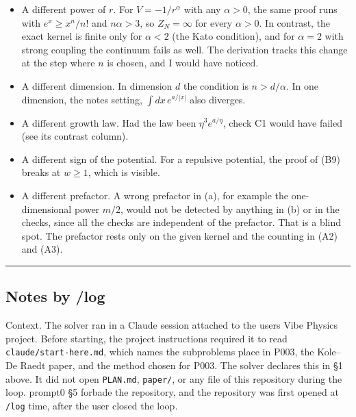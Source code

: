 \documentclass[11pt,a4paper]{article}
\providecommand{\passthrough}[1]{#1}
\providecommand{\tightlist}{\setlength{\itemsep}{0pt}\setlength{\parskip}{0pt}}
\begin{document}
\begin{itemize}
\tightlist
\item
  A different power of \(r\). For \(V=-1/r^\alpha\) with any \(\alpha>0\), the same proof runs with \(e^x\ge x^n/n!\) and \(n\alpha>3\), so \(Z_N=\infty\) for every \(\alpha>0\). In contrast, the exact kernel is finite only for \(\alpha<2\) (the Kato condition), and for \(\alpha=2\) with strong coupling the continuum fails as well. The derivation tracks this change at the step where \(n\) is chosen, and I would have noticed.
\item
  A different dimension. In dimension \(d\) the condition is \(n>d/\alpha\). In one dimension, the notes\textquotesingle{} setting, \(\int dx\,e^{a/|x|}\) also diverges.
\item
  A different growth law. Had the law been \(\eta^3e^{a/\eta}\), check C1 would have failed (see its contrast column).
\item
  A different sign of the potential. For a repulsive potential, the proof of (B9) breaks at \(w\ge1\), which is visible.
\item
  A different prefactor. A wrong prefactor in (a), for example the one-dimensional power \(m/2\), would not be detected by anything in (b) or in the checks, since all the checks are independent of the prefactor. That is a blind spot. The prefactor rests only on the given kernel and the counting in (A2) and (A3).
\end{itemize}

\begin{center}\rule{0.5\linewidth}{0.5pt}\end{center}

\hypertarget{notes-by-log}{%
\subsection{Notes by /log}\label{notes-by-log}}

Context. The solver ran in a Claude session attached to the user\textquotesingle s Vibe Physics project. Before starting, the project instructions required it to read \passthrough{\lstinline!claude/start-here.md!}, which names the subproblem\textquotesingle s place in P003, the Kole--De Raedt paper, and the method chosen for P003. The solver declares this in §1 above. It did not open \passthrough{\lstinline!PLAN.md!}, \passthrough{\lstinline!paper/!}, or any file of this repository during the loop. prompt0 §5 forbade the repository, and the repository was first opened at \passthrough{\lstinline!/log!} time, after the user closed the loop.
\end{document}
